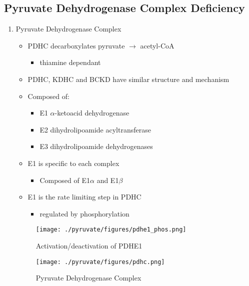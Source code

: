 \documentclass{scrartcl}
\begin{document}
\subsection{Pyruvate Dehydrogenase Complex Deficiency}
\label{sec:orgf8194d4}
\begin{enumerate}
\item Pyruvate Dehydrogenase Complex
\label{sec:org9720be9}
\begin{itemize}
\item PDHC decarboxylates pyruvate \(\to\) acetyl-CoA
\begin{itemize}
\item thiamine dependant
\end{itemize}
\item PDHC, KDHC and BCKD have similar structure and mechanism
\item Composed of:
\begin{itemize}
\item E1 \(\alpha\)-ketoacid dehydrogenase
\item E2 dihydrolipoamide acyltransferase
\item E3 dihydrolipoamide dehydrogenases
\end{itemize}
\item E1 is specific to each complex
\begin{itemize}
\item Composed of E1\(\alpha\) and E1\(\beta\)
\end{itemize}
\item E1 is the rate limiting step in PDHC
\begin{itemize}
\item regulated by phosphorylation
\end{itemize}
\end{itemize}

\begin{figure}[htbp]
\centering
\texttt{[image: ./pyruvate/figures/pdhe1\_phos.png]}
\caption[pdhe1]{\label{fig:orgb2b5b65}
Activation/deactivation of PDHE1}
\end{figure}


\begin{figure}[htbp]
\centering
\texttt{[image: ./pyruvate/figures/pdhc.png]}
\caption[pdhc]{\label{fig:org4053b81}
Pyruvate Dehydrogenase Complex}
\end{figure}


\end{enumerate}
\end{document}
